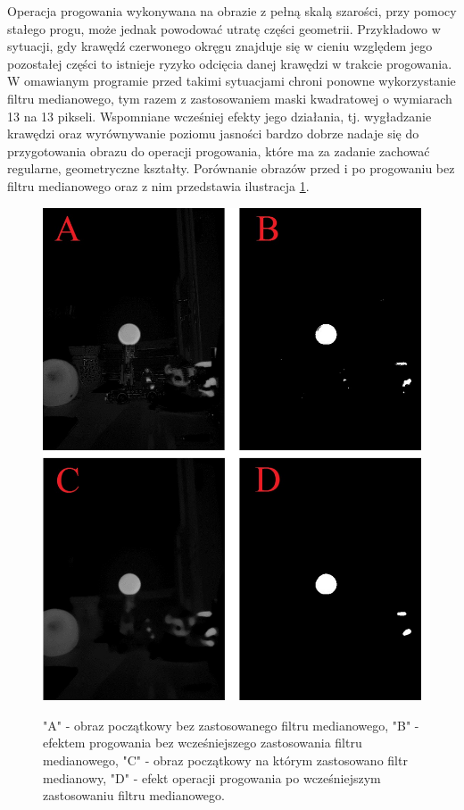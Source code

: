 Operacja progowania wykonywana na obrazie z pełną skalą szarości, przy pomocy stałego progu, może jednak powodować utratę części geometrii. Przykładowo w sytuacji, gdy krawędź czerwonego okręgu znajduje się w cieniu względem jego pozostałej części to istnieje ryzyko odcięcia danej krawędzi w trakcie progowania. W omawianym programie przed takimi sytuacjami chroni ponowne wykorzystanie filtru medianowego, tym razem z zastosowaniem maski kwadratowej o wymiarach 13 na 13 pikseli. Wspomniane wcześniej efekty jego działania, tj. wygładzanie krawędzi oraz wyrównywanie poziomu jasności bardzo dobrze nadaje się do przygotowania obrazu do operacji progowania, które ma za zadanie zachować regularne, geometryczne kształty. Porównanie obrazów przed i po progowaniu bez filtru medianowego oraz z nim przedstawia ilustracja \ref{threshold}.
\begin{figure}[H]
\begin{center}
\includegraphics[scale=0.6]{imgs/img_prog+med.jpg}
\caption[Efekt progowania z oraz bez filtru medianowego.]\small{"A" - obraz początkowy bez zastosowanego filtru medianowego, "B" - efektem progowania bez wcześniejszego zastosowania filtru medianowego, "C" - obraz początkowy na którym zastosowano filtr medianowy, "D" - efekt operacji progowania po wcześniejszym zastosowaniu filtru medianowego.}
\label{threshold}
\end{center}
\end{figure}

